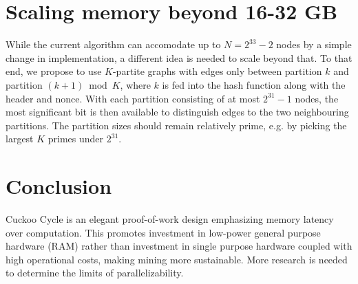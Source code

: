 \documentclass[11pt, oneside]{article}
\begin{document}
\section{Scaling memory beyond 16-32 GB}
While the current algorithm can accomodate up to $N=2^{33}-2$ nodes by a simple change
in implementation, a different idea is needed to scale beyond that.
To that end, we propose to use $K$-partite graphs with edges only between partition $k$ and partition $(k+1) \bmod K$,
where $k$ is fed into the hash function along with the header and nonce. With each partition consisting of at most
$2^{31}-1$ nodes, the most significant bit is then available to distinguish edges to the two neighbouring partitions.
The partition sizes should remain relatively prime, e.g. by picking the largest $K$ primes under $2^{31}$.

\section{Conclusion}
Cuckoo Cycle is an elegant proof-of-work design emphasizing memory latency over computation.
This promotes investment in low-power general purpose hardware (RAM) rather than investment
in single purpose hardware coupled with high operational costs, making mining more sustainable.
More research is needed to determine the limits of parallelizability.



\end{document}
